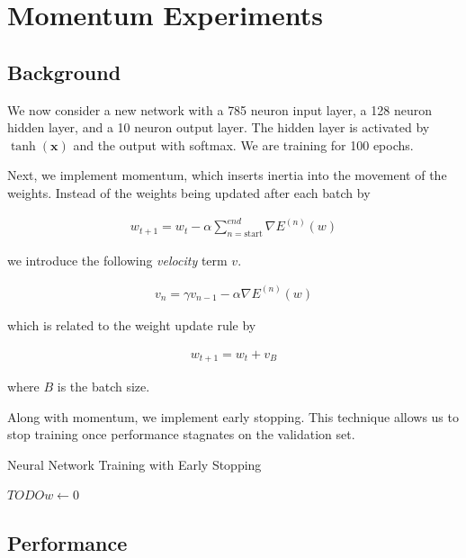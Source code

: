 \section{Momentum Experiments}

\subsection{Background}

We now consider a new network with a 785 neuron input layer, a 128 neuron
hidden layer, and a 10 neuron output layer. The hidden layer is activated by
$\tanh(\mathbf x)$ and the output with softmax. We are training for 100 epochs.

Next, we implement momentum, which inserts inertia into the movement of the weights.
Instead of the weights being updated after each batch by

\begin{align*}
	w_{t + 1} = w_t - \alpha \sum_{n = \text{start}}^{end} \nabla E^{(n)}(w)
\end{align*}

we introduce the following \textit{velocity} term $v$.

\begin{align*}
	v_n = \gamma v_{n-1} - \alpha \nabla E^{(n)}(w)
\end{align*}

which is related to the weight update rule by

\begin{align*}
	w_{t+1} = w_t + v_B
\end{align*}


where $B$ is the batch size.

Along with momentum, we implement early stopping. This technique allows us
to stop training once performance stagnates on the validation set.


\begin{algorithm}
	\caption{Neural Network Training with Early Stopping}
	\begin{algorithmic}
		\State $TODO w \gets 0$
	\end{algorithmic}
\end{algorithm}


\subsection{Performance}

